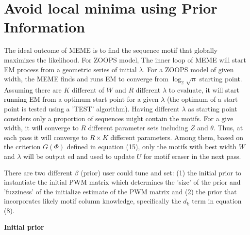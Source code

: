 \documentclass{article}
\begin{document}
\section{Avoid local minima using Prior Information}
The ideal outcome of MEME is to find the sequence motif that globally maximizes the likelihood. For ZOOPS model, The inner loop of MEME will start EM process from a geometric series of initial $\lambda$. For a ZOOPS model of given width, the MEME finds and runs EM to converge from $\log_2{\sqrt{n}}$ starting point. Assuming there are $K$ different of $W$ and $R$ different $\lambda$ to evaluate, it will start running EM from a optimum start point for a given $\lambda$ (the optimum of a start point is tested using a 'TEST' algorithm). Having different $\lambda$ as starting point considers only a proportion of sequences might contain the motifs. For a give width, it will converge to $R$ different parameter sets including $Z$ and $\theta$. Thus, at each pass it will converge to $R\times K$ different parameters. Among them, based on the criterion $G(\Phi)$ defined in equation (15), only the motifs with best width $W$ and $\lambda$ will be output ed and used to update $U$ for motif eraser in the next pass. 


There are two different $\beta$ (prior) user could tune and set: (1) the initial prior to instantiate the initial PWM matrix which determines the 'size' of the prior and 'fuzziness' of the initialize estimate of the PWM matrix and (2) the prior that incorporates likely motif column knowledge, specifically the $d_k$ term in equation (8). 


\textbf{Initial prior} 
\end{document}
